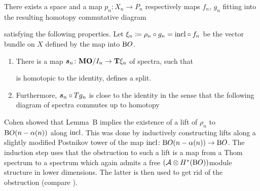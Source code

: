 \begin{Thm*}
  There exists a space and a map $p_n\colon X_n\to P_n$
  respectively maps $f_n$, $g_n$ fitting into the resulting
  homotopy commutative diagram
  \begin{center}
  \end{center}
  satisfying the following properties.
  Let $\xi_n\coloneqq \rho_n\circ g_n=\mathrm{incl}\circ f_n$ be the vector bundle on
  $X$ defined by the map into $\mathrm{B}O$.
  \begin{enumerate}
  \item\label{item:bomodinfactorisation:1}
    There is a map $\bm{s}_n\colon \bm{\mathrm{MO}}/I_{n}\to\bm{\mathrm{T}}{\xi_n}$ of
    spectra, such that
    \begin{center}
    \end{center}
    is homotopic to the identity, \idest defines a split.
  \item\label{item:bomodinfactorisation:2}
    Furthermore, $\bm{s}_n\circ T{g_n}$ is close to the
    identity in the sense that the following diagram of spectra
    commutes up to homotopy
    \begin{center}
    \end{center}
  \end{enumerate}
\end{Thm*}
Cohen showed that Lemma~B implies the existence of a lift of $\rho_n$
to $\mathrm{B}O(n-\alpha(n))$ along $\mathrm{incl}$. This was done by inductively
constructing lifts along a slightly modified Postnikov tower of
the map $\mathrm{incl}\colon\mathrm{B}O(n-\alpha(n))\to\mathrm{B}O$.
The induction step uses that the obstruction to such a lift is
a map from a Thom spectrum to a spectrum which again admits a
free $(\mathcal{A}\otimes H^*(\mathrm{B}O))$\nbd{}module structure in lower dimensions.
The latter is then used to get rid of the obstruction
(compare \cite[p.~118f]{immersionconj}).

